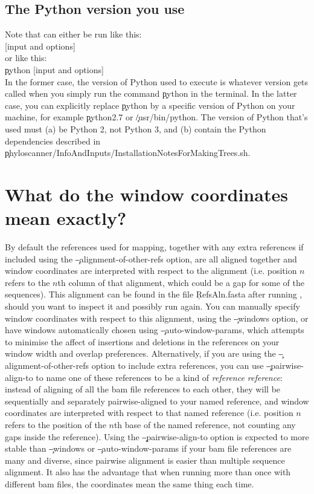 \subsection{The Python version you use}
Note that \pmt can either be run like this:\\
\pmt\c{ [input and options]}\\
or like this:\\
\c{python }\pmt\c{ [input and options]}\\
In the former case, the version of Python used to execute \pmt is whatever version gets called when you simply run the command \c{python} in the terminal.
In the latter case, you can explicitly replace \c{python} by a specific version of Python on your machine, for example \c{python2.7} or \c{/usr/bin/python}.
The version of Python that's used must (a) be Python 2, not Python 3, and (b) contain the Python dependencies described in \mbox{\c{phyloscanner/InfoAndInputs/InstallationNotesForMakingTrees.sh}}.

\section{What do the window coordinates mean exactly?} \label{sec:CoordMeaning}
By default the references used for mapping, together with any extra references if included using the \c{--alignment-of-other-refs} option, are all aligned together and window coordinates are interpreted with respect to the alignment (i.e. position $n$ refers to the $n$th column of that alignment, which could be a gap for some of the sequences).
This alignment can be found in the file \c{RefsAln.fasta} after running \pmt, should you want to inspect it and possibly run again.
You can manually specify window coordinates with respect to this alignment, using the \c{--windows} option, or have windows automatically chosen using \c{--auto-window-params}, which attempts to minimise the affect of insertions and deletions in the references on your window width and overlap preferences.
Alternatively, if you are using the \c{--alignment-of-other-refs} option to include extra references, you can use \c{--pairwise-align-to} to name one of these references to be a kind of {\it reference reference}: instead of aligning of all the bam file references to each other, they will be sequentially and separately pairwise-aligned to your named reference, and window coordinates are interpreted with respect to that named reference (i.e. position $n$ refers to the position of the $n$th base of the named reference, not counting any gaps inside the reference).
Using the \c{--pairwise-align-to} option is expected to more stable than \c{--windows} or \c{--auto-window-params} if your bam file references are many and diverse, since pairwise alignment is easier than multiple sequence alignment.
It also has the advantage that when running \pmt more than once with different bam files, the coordinates mean the same thing each time.

